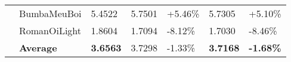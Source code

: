 \begin{table}[t]
{\begin{tabular}{|P{0.1cm}|l|P{0.9cm}||R{0.9cm}|R{1.2cm}|R{0.9cm}|R{1.2cm}|}
&BumbaMeuBoi&5.4522   &5.7501 &+5.46\%& 5.7305&+5.10\%  \\
&RomanOiLight& 1.8604  &1.7094 &-8.12\%& 1.7030&-8.46\% \\
&\textbf{Average}  &\textbf{3.6563}  &3.7298 &-1.33\%&\textbf{3.7168}&\textbf{-1.68\%}  \\

\hline
\hline
\end{tabular}}
\label{table:singlevsmulti}

\end{table}
